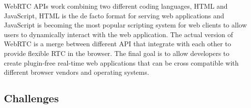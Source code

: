 WebRTC APIs work combining two different coding languages, HTML and JavaScript, HTML is the de facto format for serving web applications and JavaScript is becoming the most popular scripting system for web clients to allow users to dynamically interact with the web application. The actual version of WebRTC is a merge between different API that integrate with each other to provide flexible RTC in the browser. The final goal is to allow developers to create plugin-free real-time web applications that can be cross compatible with different browser vendors and operating systems.

%



\subsection{Challenges}

